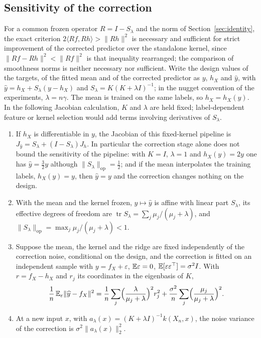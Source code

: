 \subsection{Sensitivity of the correction}\label{sec:sensitivity}

For a common frozen operator $R=I-S_\lambda$ and the norm of Section~\ref{sec:identity}, the exact criterion
$2\langle Rf,Rh\rangle>\|Rh\|^2$ is necessary and sufficient for strict improvement of the corrected predictor over
the standalone kernel, since $\|Rf-Rh\|^2<\|Rf\|^2$ is that inequality rearranged; the comparison of smoothness
norms is neither necessary nor sufficient. Write the design values of the targets, of the fitted mean and of the
corrected predictor as $y$, $h_X$ and $\widehat y$, with $\widehat y=h_X+S_\lambda(y-h_X)$ and
$S_\lambda=K(K+\lambda I)^{-1}$; in the nugget convention of the experiments, $\lambda=n\gamma$. The mean is trained
on the same labels, so $h_X=h_X(y)$. In the following Jacobian calculation,
$K$ and $\lambda$ are held fixed; label-dependent feature or kernel selection would add
terms involving derivatives of $S_\lambda$.

\begin{proposition}\label{prop:sensitivity}
\begin{enumerate}
\item If $h_X$ is differentiable in $y$, the Jacobian of this fixed-kernel pipeline is
$J_{\widehat y}=S_\lambda+(I-S_\lambda)J_{h}$. In particular the correction stage alone does not bound the
sensitivity of the pipeline: with $K=I$, $\lambda=1$ and $h_X(y)=2y$ one has $\widehat y=\tfrac32 y$ although
$\|S_\lambda\|_{\mathrm{op}}=\tfrac12$; and if the mean interpolates the training labels, $h_X(y)=y$, then
$\widehat y=y$ and the correction changes nothing on the design.
\item With the mean and the kernel frozen, $y\mapsto\widehat y$ is affine with linear part $S_\lambda$, its
effective degrees of freedom are $\operatorname{tr}S_\lambda=\sum_j\mu_j/(\mu_j+\lambda)$, and
$\|S_\lambda\|_{\mathrm{op}}=\max_j\mu_j/(\mu_j+\lambda)<1$.
\item Suppose the mean, the kernel and the ridge are fixed independently of the correction noise, conditional on
the design, and the correction is fitted on an independent sample with $y=f_X+\varepsilon$, $\mathbb{E}\varepsilon=0$,
$\mathbb{E}[\varepsilon\varepsilon^{\top}]=\sigma^2I$. With $r=f_X-h_X$ and $r_j$ its coordinates in the
eigenbasis of $K$,
\[
\frac1n\,\mathbb{E}_\varepsilon\|\widehat y-f_X\|^2
=\frac1n\sum_j\Bigl(\frac{\lambda}{\mu_j+\lambda}\Bigr)^2r_j^2
+\frac{\sigma^2}{n}\sum_j\Bigl(\frac{\mu_j}{\mu_j+\lambda}\Bigr)^2 .
\]
\item At a new input $x$, with $a_\lambda(x)=(K+\lambda I)^{-1}k(X_n,x)$, the noise variance of the correction
is $\sigma^2\|a_\lambda(x)\|_2^2$.
\end{enumerate}
\end{proposition}

